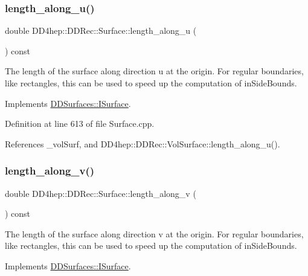 \subsubsection{\texorpdfstring{length\+\_\+along\+\_\+u()}{length\_along\_u()}}
{\footnotesize\ttfamily double D\+D4hep\+::\+D\+D\+Rec\+::\+Surface\+::length\+\_\+along\+\_\+u (\begin{DoxyParamCaption}{ }\end{DoxyParamCaption}) const\hspace{0.3cm}{\ttfamily [virtual]}}

The length of the surface along direction u at the origin. For \textquotesingle{}regular\textquotesingle{} boundaries, like rectangles, this can be used to speed up the computation of in\+Side\+Bounds. 

Implements \hyperlink{class_d_d_surfaces_1_1_i_surface_a0060710912d3447e296a8e0875690cc9}{D\+D\+Surfaces\+::\+I\+Surface}.



Definition at line 613 of file Surface.\+cpp.



References \+\_\+vol\+Surf, and D\+D4hep\+::\+D\+D\+Rec\+::\+Vol\+Surface\+::length\+\_\+along\+\_\+u().

\hypertarget{class_d_d4hep_1_1_d_d_rec_1_1_surface_ad28657a514fe91a4f5fa74cec1c3888d}{}\label{class_d_d4hep_1_1_d_d_rec_1_1_surface_ad28657a514fe91a4f5fa74cec1c3888d} 
\subsubsection{\texorpdfstring{length\+\_\+along\+\_\+v()}{length\_along\_v()}}
{\footnotesize\ttfamily double D\+D4hep\+::\+D\+D\+Rec\+::\+Surface\+::length\+\_\+along\+\_\+v (\begin{DoxyParamCaption}{ }\end{DoxyParamCaption}) const\hspace{0.3cm}{\ttfamily [virtual]}}

The length of the surface along direction v at the origin. For \textquotesingle{}regular\textquotesingle{} boundaries, like rectangles, this can be used to speed up the computation of in\+Side\+Bounds. 

Implements \hyperlink{class_d_d_surfaces_1_1_i_surface_a9a4682bfa68557d53cfd319cfa54148d}{D\+D\+Surfaces\+::\+I\+Surface}.



